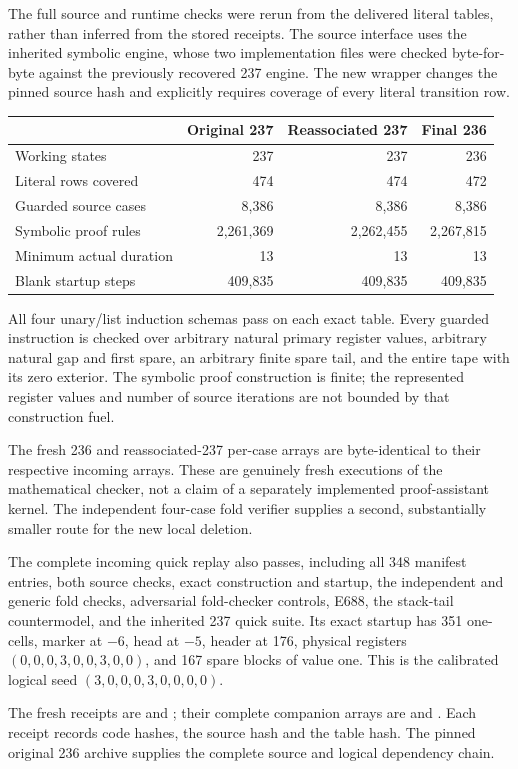 The full source and runtime checks were rerun from the delivered literal
tables, rather than inferred from the stored receipts. The source interface
uses the inherited symbolic engine, whose two implementation files were
checked byte-for-byte against the previously recovered 237 engine.
The new wrapper changes the pinned source hash and explicitly requires
coverage of every literal transition row.

\begin{center}
\begin{tabular}{@{}lrrr@{}}
\toprule & Original 237 & Reassociated 237 & Final 236\\\midrule
Working states &237&237&236\\
Literal rows covered &474&474&472\\
Guarded source cases &8,386&8,386&8,386\\
Symbolic proof rules &2,261,369&2,262,455&2,267,815\\
Minimum actual duration &13&13&13\\
Blank startup steps &409,835&409,835&409,835\\
\bottomrule
\end{tabular}
\end{center}

All four unary/list induction schemas pass on each exact table. Every
guarded instruction is checked over arbitrary natural primary register
values, arbitrary natural gap and first spare, an arbitrary finite spare
tail, and the entire tape with its zero exterior. The symbolic proof
construction is finite; the represented register values and number of
source iterations are not bounded by that construction fuel.

The fresh 236 and reassociated-237 per-case arrays are byte-identical to
their respective incoming arrays. These are genuinely fresh executions
of the mathematical checker, not a claim of a separately implemented
proof-assistant kernel. The independent four-case fold verifier supplies
a second, substantially smaller route for the new local deletion.

The complete incoming quick replay also passes, including all 348
manifest entries, both source checks, exact construction and startup,
the independent and generic fold checks, adversarial fold-checker
controls, E688, the stack-tail countermodel, and the inherited 237
quick suite. Its exact startup has 351 one-cells, marker at $-6$, head
at $-5$, header at 176, physical registers
$(0,0,0,3,0,0,3,0,0)$, and 167 spare blocks of value one. This is the
calibrated logical seed $(3,0,0,0,3,0,0,0,0)$.

The fresh receipts are  and
; their complete companion
arrays are  and
. Each receipt records
code hashes, the source hash and the table hash. The pinned original 236
archive supplies the complete source and logical dependency chain.

